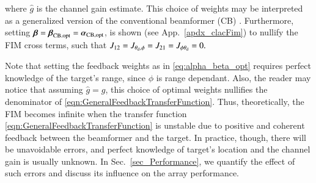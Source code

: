 where $\hat{g}$ is the channel gain estimate.
This choice of weights may be interpreted as a generalized version of the conventional beamformer (CB) \cite{van2004optimum}. 
Furthermore, setting $\boldsymbol{\beta}=\boldsymbol{\beta}_{\text{CB,opt}}=\boldsymbol{\alpha}_{\text{CB,opt}}$, is shown (see App.~\ref{apdx_clacFim}) to nullify the FIM cross terms, such that $J_{12}=J_{\theta_{\text{d}},\phi}=J_{21}=J_{\phi\theta_{\text{d}}}=0.$
\par Note that setting the feedback weights as in \eqref{eq:alpha_beta_opt} requires perfect knowledge of the target's range, since $\phi$ is range dependant.
Also, the reader may notice that   assuming $\hat{g}=g$, this choice of optimal weights nullifies the denominator of  \eqref{eqn:GeneralFeedbackTransferFunction}. Thus, theoretically, the FIM becomes infinite when the transfer function \eqref{eqn:GeneralFeedbackTransferFunction} is unstable due to positive and coherent feedback between the beamformer and the target. 
In practice, though, there will be unavoidable errors, and perfect knowledge of target's location and the channel gain is usually unknown.
In Sec.~\ref{sec_Performance}, we quantify the effect of such errors and discuss its influence on the array performance. 